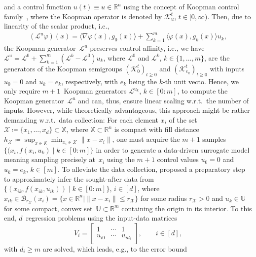 \documentclass[a4paper, reqno]{amsart}
\newcommand{\R}{\ensuremath{\mathbb R}}
\begin{document}
and a control function $u(t) \equiv u \in \mathbb{R}^n$ using the concept of Koopman control family~\cite{haseli2025two}, 
where the Koopman operator is 
denoted by $\mathcal{K}^t_u$, $t \in [0, \infty)$. Then, due to linearity of the scalar product, i.e., 
\begin{align*}
    (\mathcal{L}^u \varphi)(x) = \langle \nabla \varphi(x), g_0(x) \rangle + \sum\nolimits_{k = 1}^m \langle \varphi(x), g_k(x) \rangle u_k,
\end{align*}
the Koopman generator~$\mathcal{L}^u$ preserves control affinity, i.e., we have $\mathcal{L}^u = \mathcal{L}^0 + \sum\nolimits_{k = 1}^m (\mathcal{L}^k - \mathcal{L}^0) u_k$, where $\mathcal{L}^0$ and $\mathcal{L}^k$, $k \in \{1, \dots, m\}$, are the generators of the Koopman semigroups $(\mathcal{K}^t_0)_{t \geq 0}$ and $(\mathcal{K}^t_{e_k})_{t \geq 0}$ with inputs $u_0 = 0$ and $u_k = e_k$, respectively, with $e_k$ being the $k$-th unit vecto.
Hence, we only require $m+1$~Koopman generators $\mathcal{L}^{u_k}$, $k \in [0:m]$, to compute the Koopman generator~$\mathcal{L}^u$ and can, thus, ensure linear scaling w.r.t.\ the number of inputs. 
However, while theoretically advantageous, this approach might be rather demanding w.r.t.\ data collection: For each element $x_i$ 
of the set $\mathcal{X} \coloneqq \{x_1, \dots, x_d\} \subset \mathbb{X}$, where $\mathbb{X} \subset \R^n$ is compact with fill distance~$h_\mathcal{X} \coloneqq \sup_{x \in \mathbb{X}}\min_{x_i \in \mathcal{X}} \|x - x_i\|$,
one must acquire the $m+1$ samples $\{(x_i,f(x_i,u_k) \mid k \in [0:m]\}$ in order to generate a data-driven surrogate model meaning sampling precisely at~$x_i$ using the $m+1$ control values $u_0 = 0$ and $u_k = e_k$, $k \in [m]$. 
To alleviate the data collection, \cite{BoldPhil24} proposed a preparatory step to approximately infer the sought-after data from 
$\{(x_{ik},f(x_{ik},u_{ik})) \mid k \in [0:m]\}$, $i \in [d]$, where $x_{ik} \in \mathcal{B}_{r_\mathcal{X}}(x_i) = \{ x \in \mathbb{R}^n | \|x-x_i\| \leq r_{\mathcal{X}}\}$ for some radius $r_{\mathcal{X}} > 0$ and $u_k \in \mathbb{U}$ for some compact, convex set~$\mathbb{U} \subset \mathbb{R}^m$ containing the origin in its interior. 
To this end, $d$~regression problems using the input-data matrices
$$
    V_i = \begin{bmatrix}
            1 & \cdots & 1\\
            u_{i0} & \cdots & u_{id_i} 
    \end{bmatrix}, \qquad i \in [d],
$$
with $d_i \geq m$ are solved, which leads, e.g., to the  error bound
\end{document}
